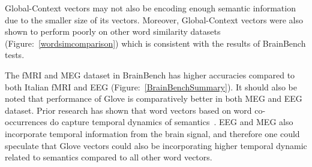 Global-Context vectors may not also be encoding enough semantic information due to the smaller size of its vectors. Moreover, Global-Context vectors were also shown to perform poorly on other word similarity datasets (Figure:~\ref{wordsimcomparison}) which is consistent with the results of BrainBench tests.

The fMRI and MEG dataset in BrainBench has higher accuracies compared to both Italian fMRI and EEG (Figure:~\ref{BrainBenchSummary}). It should also be noted that performance of Glove is comparatively better in both MEG and EEG dataset. Prior research has shown that word vectors based on word co-occurrences do capture temporal dynamics of semantics~\cite{TemporalDynamics}. EEG and MEG also incorporate temporal information from the brain signal, and therefore one could speculate that Glove vectors could also be incorporating higher temporal dynamic related to semantics compared to all other word vectors. 


